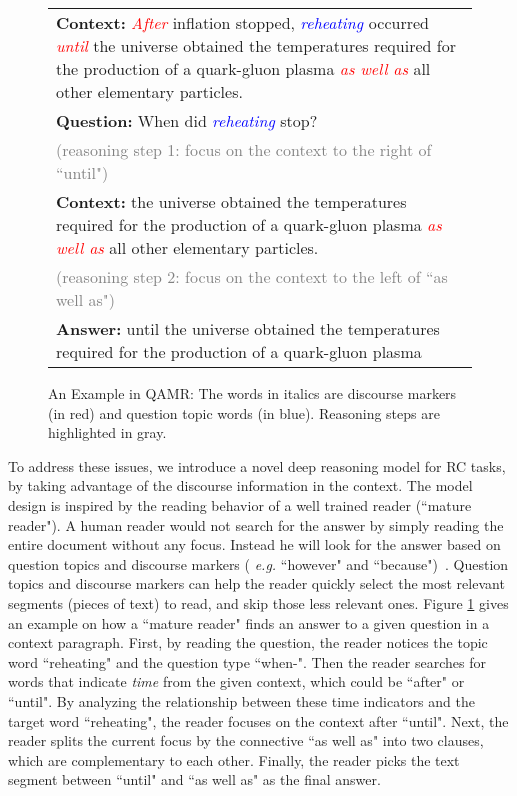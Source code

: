 \begin{figure}[t]
	{\fontsize{9}{10}\selectfont
    \setlength{\tabcolsep}{0.6mm}
    \begin{tabular}{|p{75mm}|}
    \hline
\textbf{Context: }\textit{\textcolor{red}{After}} inflation stopped, \textit{\textcolor{blue}{reheating }}occurred \textit{\textcolor{red}{until}} the universe obtained the temperatures required for the production of a quark-gluon plasma \textit{\textcolor{red}{as well as}} all other elementary particles. \\
\textbf{Question: }When did \textit{\textcolor{blue}{reheating}} stop?     \\
\textcolor{gray}{(reasoning step 1: focus on the context to the right of ``until")}\\
\textbf{Context: }the universe obtained the temperatures required for the production of a quark-gluon plasma \textit{\textcolor{red}{as well as}} all other elementary particles. \\
\textcolor{gray}{(reasoning step 2: focus on the context to the left of ``as well as")}\\
\textbf{Answer: }until the universe obtained the temperatures required for the production of a quark-gluon plasma \\
\hline
    \end{tabular}
    }
\caption{An Example in QAMR: The words in italics are discourse markers (in red) and question topic words (in blue). Reasoning steps are highlighted in gray. }
\label{fig:qa_example}
\vspace{-3ex}
\end{figure}
To address these issues, we introduce a novel deep reasoning model for RC tasks, by taking advantage of the discourse information in the context. The model design is inspired by the reading behavior of a well trained reader (``mature reader"). A human reader would not search for the answer by simply reading the entire document without any focus. Instead he will look for the answer based on question topics and discourse markers ( \emph{e.g.} ``however" and ``because")~\cite{assiri2011test,sungatullina2016metacognitive}. Question topics and discourse markers can help the reader quickly select the most relevant segments (pieces of text) to read, and skip those less relevant ones. Figure \ref{fig:qa_example} gives an example on how a ``mature reader" finds an answer to a given question in a context paragraph. First, by reading the question, the reader notices the topic word ``reheating" and the question type ``when-". Then the reader searches for words that indicate \emph{time} from the given context, which could be ``after" or ``until". By analyzing the relationship between these time indicators and the target word ``reheating", the reader focuses on the context after ``until". Next, the reader splits the current focus by the connective ``as well as" into two clauses, which are complementary to each other. Finally, the reader picks the text segment between ``until" and ``as well as" as the final answer.

